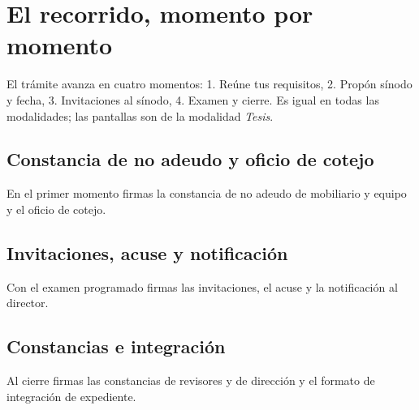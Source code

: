 \section{El recorrido, momento por momento}
El trámite avanza en cuatro momentos: 1. Reúne tus requisitos, 2. Propón sínodo y fecha, 3. Invitaciones al sínodo, 4. Examen y cierre. Es igual en todas las modalidades; las pantallas son de la modalidad \emph{Tesis}.
\subsection{Constancia de no adeudo y oficio de cotejo}
En el primer momento firmas la constancia de no adeudo de mobiliario y equipo y el oficio de cotejo.
\subsection{Invitaciones, acuse y notificación}
Con el examen programado firmas las invitaciones, el acuse y la notificación al director.
\subsection{Constancias e integración}
Al cierre firmas las constancias de revisores y de dirección y el formato de integración de expediente.

